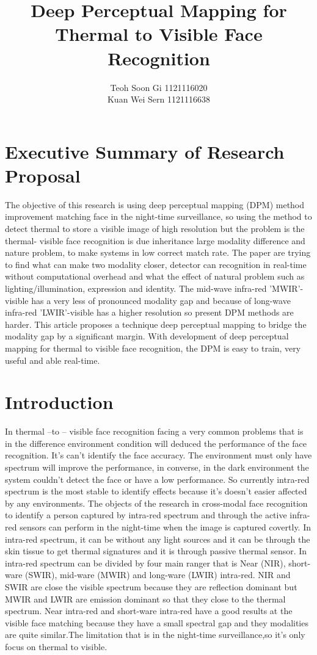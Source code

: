 \documentclass[a4paper, 12pt]{article}
\title{\textbf{Deep Perceptual Mapping for Thermal to Visible Face Recognition}}
\author{Teoh Soon Gi 1121116020
		\\Kuan Wei Sern 1121116638}
\begin{document}


\maketitle


\section{Executive Summary of Research Proposal}

The objective of this research is using deep perceptual mapping (DPM) method improvement matching face in the night-time surveillance, so using the method to detect thermal to store a visible image of high resolution but the problem is the thermal- visible face recognition is due inheritance large modality difference and nature problem, to make systems in low correct match rate. The paper are trying to find what can make two modality closer, detector can recognition in real-time without computational overhead and what the effect of natural problem such as lighting/illumination, expression and identity. The mid-wave infra-red 'MWIR'-visible has a very less of pronounced modality gap and because of long-wave infra-red 'LWIR'-visible has a higher resolution so present DPM methods are harder. This article proposes a technique deep perceptual mapping to bridge the modality gap by a significant margin. With development of deep perceptual mapping for thermal to visible face recognition, the DPM is easy to train, very useful and able real-time.


\section{Introduction}

    In thermal –to – visible face recognition facing a very common problems that is in the difference environment condition will deduced the performance of the face recognition. It’s can’t identify the face accuracy. The environment must only have spectrum will improve the performance, in converse, in the dark environment the system couldn’t detect the face or have a low performance. So currently intra-red spectrum is the most stable to identify effects because it’s doesn’t easier affected by any environments. The objects of the research in cross-modal face recognition to identify a person captured by intra-red spectrum and through the active infra-red sensors can perform in the night-time when the image is captured covertly. In intra-red spectrum, it can be without any light sources and it can be through the skin tissue to get thermal signatures and it is through passive thermal sensor. In intra-red spectrum can be divided by four main ranger that is Near (NIR), short-ware (SWIR), mid-ware (MWIR) and long-ware (LWIR) intra-red. NIR and SWIR are close the visible spectrum because they are reflection dominant but MWIR and LWIR are emission dominant so that they close to the thermal spectrum. Near intra-red and short-ware intra-red have a good results at the visible face matching because they have a small spectral gap and they modalities are quite similar.The limitation that is in the night-time surveillance,so it's only focus on thermal to visible. 
\end{document}
